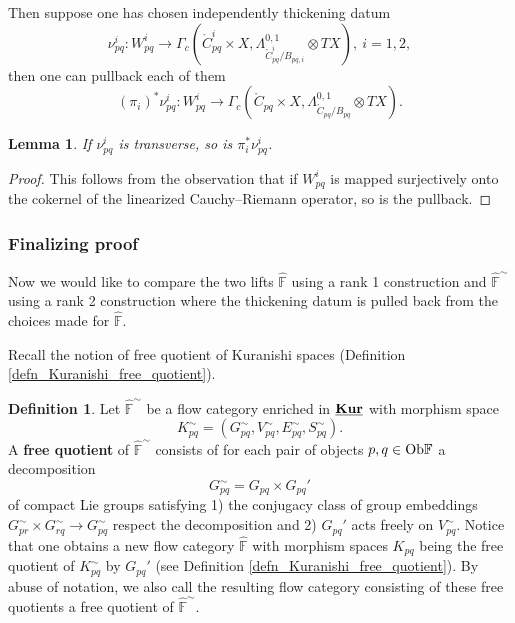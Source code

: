 \documentclass[reqno, 10pt]{amsart}
\numberwithin{equation}{section}
\numberwithin{equation}{section}
\newtheorem{lemma}[thm]{Lemma}
\theoremstyle{definition}
\newtheorem{defn}[thm]{Definition}
\theoremstyle{remark}
\newcommand{\beqn}{\begin{equation*}}
\newcommand{\eeqn}{\end{equation*}}
\newcommand{\mb}{\mathbb}
\newcommand{\uds}[1]{\underline{\smash{#1}}}
\begin{document}
Then suppose one has chosen independently thickening datum
\beqn
\nu_{pq}^i: W_{pq}^i \to \Gamma_c( \mathring C_{pq}^i \times X, \Lambda_{\mathring C_{pq}^i / B_{pq, i}}^{0, 1} \otimes TX),\ i = 1, 2,
\eeqn
then one can pullback each of them
\beqn
(\pi_i)^* \nu_{pq}^i: W_{pq}^i \to \Gamma_c( \mathring C_{pq} \times X, \Lambda_{\mathring C_{pq}/ B_{pq}}^{0,1}\otimes TX).
\eeqn

\begin{lemma}\label{lemma193}
If $\nu_{pq}^i$ is transverse, so is $\pi_i^* \nu_{pq}^i$.
\end{lemma}

\begin{proof}
This follows from the observation that if $W_{pq}^i$ is mapped surjectively onto the cokernel of the linearized Cauchy--Riemann operator, so is the pullback.
\end{proof}

\subsubsection{Finalizing proof}

Now we would like to compare the two lifts $\hat {\mb F}$ using a rank 1 construction and $\hat {\mb F}^\sim$ using a rank 2 construction where the thickening datum is pulled back from the choices made for $\hat {\mb F}$. 

Recall the notion of free quotient of Kuranishi spaces (Definition \ref{defn_Kuranishi_free_quotient}). 


\begin{defn}
Let $\hat{\mb F}^\sim$ be a flow category enriched in $\uds{\bf Kur}$ with morphism space 
\beqn
K_{pq}^\sim = (G_{pq}^\sim, V_{pq}^\sim, E_{pq}^\sim, S_{pq}^\sim).
\eeqn
A {\bf free quotient} of $\hat{\mb F}^\sim$ consists of for each pair of objects $p, q \in {\rm Ob}{\mb F}$ a decomposition 
\beqn
G_{pq}^\sim = G_{pq} \times G_{pq}'
\eeqn
of compact Lie groups satisfying 1) the conjugacy class of group embeddings $G_{pr}^\sim \times G_{rq}^\sim \to G_{pq}^\sim$ respect the decomposition and 2) $G_{pq}'$ acts freely on $V_{pq}^\sim$. Notice that one obtains a new flow category $\hat{\mb F}$ with morphism spaces $K_{pq}$ being the free quotient of $K_{pq}^\sim$ by $G_{pq}'$ (see Definition \ref{defn_Kuranishi_free_quotient}). By abuse of notation, we also call the resulting flow category consisting of these free quotients a free quotient of $\hat{\mb F}^\sim$.
\end{defn}
\end{document}
